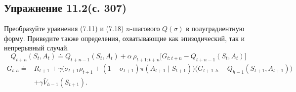 \subsection{Упражнение 11.2(с. 307)}
Преобразуйте уравнения (7.11) и (7.18) $n$-шагового $Q(\sigma)$ в полуградиентную
форму. Приведите также определения, охватывающие как эпизодический, так и
непрерывный случай.
\begin{equation}
    Q_{t+n}(S_t,A_t) \doteq Q_{t+n-1}(S_t,A_t)
    + \alpha\,\rho_{t+1:t+n}\big[G_{t:t+n} - Q_{t+n-1}(S_t,A_t)\big]
    \tag{7.11}
\end{equation}
\begin{equation}
    \begin{aligned}
    G_{t:h} \doteq{}& R_{t+1}
    + \gamma\big(\sigma_{t+1}\rho_{t+1} + (1-\sigma_{t+1})\pi(A_{t+1}\mid S_{t+1})\big)
      \big(G_{t+1:h} - Q_{h-1}(S_{t+1},A_{t+1})\big)\\
    &+ \gamma\bar V_{h-1}(S_{t+1}).
    \end{aligned}
    \tag{7.18}
\end{equation}
